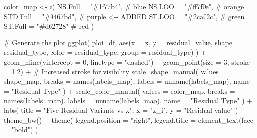 \documentclass[
  letterpaper,
  DIV=11,
  numbers=noendperiod]{scrreprt}
\newenvironment{Shaded}{\begin{snugshade}}{\end{snugshade}}
\newcommand{\AttributeTok}[1]{\textcolor[rgb]{0.40,0.45,0.13}{#1}}
\newcommand{\CommentTok}[1]{\textcolor[rgb]{0.37,0.37,0.37}{#1}}
\newcommand{\DecValTok}[1]{\textcolor[rgb]{0.68,0.00,0.00}{#1}}
\newcommand{\FloatTok}[1]{\textcolor[rgb]{0.68,0.00,0.00}{#1}}
\newcommand{\FunctionTok}[1]{\textcolor[rgb]{0.28,0.35,0.67}{#1}}
\newcommand{\NormalTok}[1]{\textcolor[rgb]{0.00,0.23,0.31}{#1}}
\newcommand{\OtherTok}[1]{\textcolor[rgb]{0.00,0.23,0.31}{#1}}
\newcommand{\SpecialCharTok}[1]{\textcolor[rgb]{0.37,0.37,0.37}{#1}}
\newcommand{\StringTok}[1]{\textcolor[rgb]{0.13,0.47,0.30}{#1}}
\begin{document}
\begin{Shaded}
\begin{Highlighting}[]
\NormalTok{color\_map }\OtherTok{\textless{}{-}} \FunctionTok{c}\NormalTok{(}
  \AttributeTok{NS.Full  =} \StringTok{"\#1f77b4"}\NormalTok{,  }\CommentTok{\# blue}
  \AttributeTok{NS.LOO   =} \StringTok{"\#ff7f0e"}\NormalTok{, }\CommentTok{\# orange}
  \AttributeTok{STD.Full =} \StringTok{"\#9467bd"}\NormalTok{,  }\CommentTok{\# purple \textless{}{-}{-} ADDED}
  \AttributeTok{ST.LOO   =} \StringTok{"\#2ca02c"}\NormalTok{,  }\CommentTok{\# green}
  \AttributeTok{ST.Full  =} \StringTok{"\#d62728"}   \CommentTok{\# red}
\NormalTok{)}

\CommentTok{\# Generate the plot}
\FunctionTok{ggplot}\NormalTok{(}
\NormalTok{  plot\_df,}
  \FunctionTok{aes}\NormalTok{(}\AttributeTok{x =}\NormalTok{ x, }\AttributeTok{y =}\NormalTok{ residual\_value,}
      \AttributeTok{shape =}\NormalTok{ residual\_type, }\AttributeTok{color =}\NormalTok{ residual\_type, }\AttributeTok{group =}\NormalTok{ residual\_type)}
\NormalTok{) }\SpecialCharTok{+}
  \FunctionTok{geom\_hline}\NormalTok{(}\AttributeTok{yintercept =} \DecValTok{0}\NormalTok{, }\AttributeTok{linetype =} \StringTok{"dashed"}\NormalTok{) }\SpecialCharTok{+}
  \FunctionTok{geom\_point}\NormalTok{(}\AttributeTok{size =} \DecValTok{3}\NormalTok{, }\AttributeTok{stroke =} \FloatTok{1.2}\NormalTok{) }\SpecialCharTok{+} \CommentTok{\# Increased stroke for visibility}
  \FunctionTok{scale\_shape\_manual}\NormalTok{(}
    \AttributeTok{values =}\NormalTok{ shape\_map,}
    \AttributeTok{breaks =} \FunctionTok{names}\NormalTok{(labels\_map),}
    \AttributeTok{labels =} \FunctionTok{unname}\NormalTok{(labels\_map),}
    \AttributeTok{name =} \StringTok{"Residual Type"}
\NormalTok{  ) }\SpecialCharTok{+}
  \FunctionTok{scale\_color\_manual}\NormalTok{(}
    \AttributeTok{values =}\NormalTok{ color\_map,}
    \AttributeTok{breaks =} \FunctionTok{names}\NormalTok{(labels\_map),}
    \AttributeTok{labels =} \FunctionTok{unname}\NormalTok{(labels\_map),}
    \AttributeTok{name =} \StringTok{"Residual Type"}
\NormalTok{  ) }\SpecialCharTok{+}
  \FunctionTok{labs}\NormalTok{(}
    \AttributeTok{title =} \StringTok{"Five Residual Variants vs x"}\NormalTok{,}
    \AttributeTok{x =} \StringTok{"x\_i"}\NormalTok{,}
    \AttributeTok{y =} \StringTok{"Residual value"}
\NormalTok{  ) }\SpecialCharTok{+}
  \FunctionTok{theme\_bw}\NormalTok{() }\SpecialCharTok{+}
  \FunctionTok{theme}\NormalTok{(}
    \AttributeTok{legend.position =} \StringTok{"right"}\NormalTok{,}
    \AttributeTok{legend.title =} \FunctionTok{element\_text}\NormalTok{(}\AttributeTok{face =} \StringTok{"bold"}\NormalTok{)}
\NormalTok{  )}
\end{Highlighting}
\end{Shaded}
\end{document}
